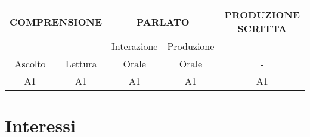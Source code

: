 \documentclass[11pt,a4paper,sans]{moderncv} %
\begin{document}
{%
	\centering
	\begin{tabular}{*{5}{c}}
		\toprule
		\multicolumn{2}{c}{\textcolor{cvcolor}{COMPRENSIONE}} & \multicolumn{2}{c}{\textcolor{cvcolor}{PARLATO}}          & \textcolor{cvcolor}{PRODUZIONE SCRITTA} \\ \midrule
		& & \textcolor{cvcolor}{Interazione} & \textcolor{cvcolor}{Produzione} & \\
		\textcolor{cvcolor}{Ascolto}         & \textcolor{cvcolor}{Lettura}        &  \textcolor{cvcolor}{Orale} &  \textcolor{cvcolor}{Orale} & -       \\             A1                & A1              & A1                 & A1                & A1      \\ \bottomrule
	\end{tabular}%
}{}


\section{Interessi}

\renewcommand{\listitemsymbol}{-~} %






\end{document}
